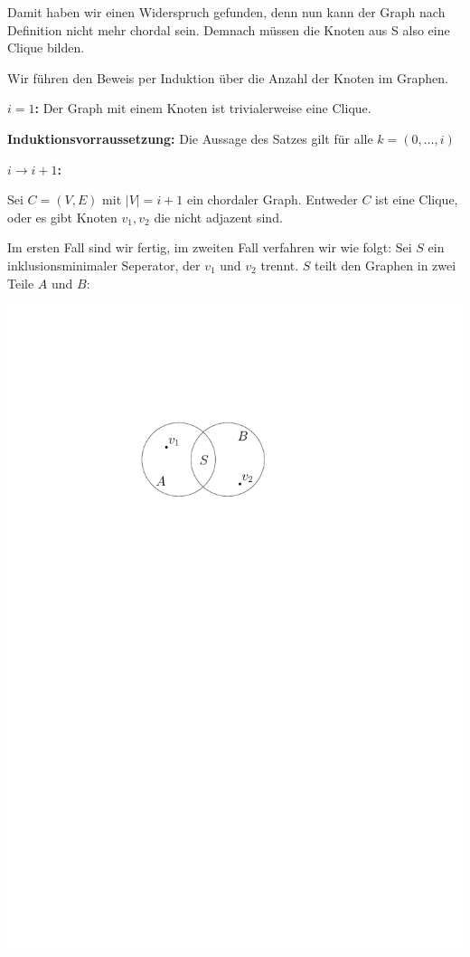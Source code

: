 Damit haben wir einen Widerspruch gefunden, denn nun kann der Graph nach Definition nicht mehr chordal sein.
Demnach müssen die Knoten aus S also eine Clique bilden.

\subexercise

Wir führen den Beweis per Induktion über die Anzahl der Knoten im Graphen.

\textbf{$i = 1$:}
Der Graph mit einem Knoten ist trivialerweise eine Clique.

\textbf{Induktionsvorraussetzung:}
Die Aussage des Satzes gilt für alle $k = (0, \dots, i)$

\textbf{$i \rightarrow i + 1$:}

Sei $C = (V,E)$ mit $|V| = i + 1$ ein chordaler Graph.
Entweder $C$ ist eine Clique, oder es gibt Knoten $v_1, v_2$ die nicht adjazent sind.

Im ersten Fall sind wir fertig, im zweiten Fall verfahren wir wie folgt:
Sei $S$ ein inklusionsminimaler Seperator, der $v_1$ und $v_2$ trennt.
$S$ teilt den Graphen in zwei Teile $A$ und $B$:

\begin{center}
    \vspace{1ex}
    \includegraphics[page=1]{fig/03-2b-sep}
\end{center}


